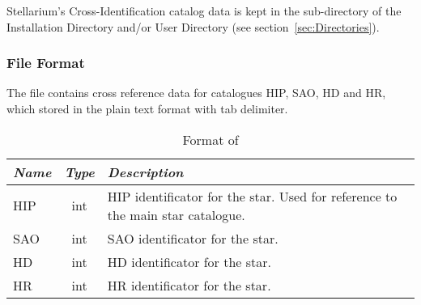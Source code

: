 
Stellarium's Cross-Identification catalog data is kept
in the  sub-directory of the Installation Directory and/or User Directory (see section~\ref{sec:Directories}).

\subsubsection{File Format}
\label{sec:StarCatalogues:CrossIdentificationData:file}

The file  contains cross reference data for catalogues HIP, SAO, HD and HR, which stored in the plain text format with tab delimiter.

\begin{table}[htb]
\begin{tabularx}{\textwidth}{l|c|X}\toprule
\emph{Name} & \emph{Type} & \emph{Description}\\\midrule
HIP	& int & HIP identificator for the star. Used for reference to the main star catalogue.\\%
SAO	& int & SAO identificator for the star.\\%
HD	& int & HD identificator for the star.\\%
HR	& int & HR identificator for the star.\\\bottomrule
\end{tabularx}
\caption{Format of }
\label{tab:StarCatalogues:CrossIdentificationData:file}
\end{table}

